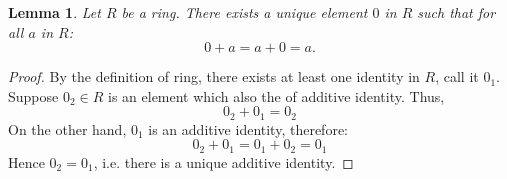 \documentclass[12pt]{article}
\newtheorem{lemma}{Lemma}
\begin{document}
\begin{lemma}
Let $R$ be a ring. There exists a unique element $0$ in $R$ such that for all $a$ in $R$:
$$0+a=a+0=a.$$
\end{lemma}
\begin{proof}
By the definition of ring, there exists at least one  identity in $R$, call it $0_1$. Suppose $0_2\in R$ is an element which also  the  of additive identity. Thus, 
$$0_2+0_1=0_2$$
On the other hand, $0_1$ is an additive identity, therefore:
$$0_2+0_1=0_1+0_2=0_1$$
Hence $0_2=0_1$, i.e. there is a unique additive identity.
\end{proof}
\end{document}
